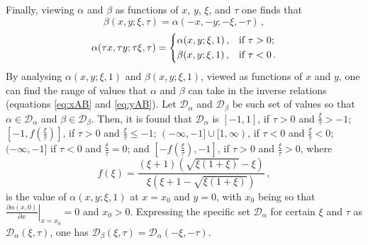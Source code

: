 \documentclass[12pt, ams, nofootinbib]{revtex4}
\def\be{\begin{equation}}
\def\ee{\end{equation}}
\newcommand{\rob}[1]{\left(#1\right)}    %
\newcommand{\sqb}[1]{\left[#1\right]}    %
\theoremstyle{definition}
\begin{document}
Finally, viewing $\alpha$ and $\beta$ as functions of $x$, $y$, $\xi$, and $\tau$ one finds that
\be 
	\beta(x,y;\xi,\tau)=\alpha(-x,-y;-\xi,-\tau)\,,
\ee
\be \alpha(\tau x,\tau y; \tau \xi,\tau) = \begin{dcases}
	\alpha(x,y;\xi,1)\,, &\text{if   }\tau>0; \\
	\beta(x,y;\xi,1)\,, &\text{if   }\tau<0\,.
\end{dcases}
\ee
By analysing $\alpha(x,y;\xi,1)$ and $\beta(x,y;\xi,1)$, viewed as functions of $x$ and $y$, one can find the range of values that $\alpha$ and $\beta$ can take in the inverse relations (equations \ref{eq:xAB} and \ref{eq:yAB}). Let $\mathcal{D}_\alpha$ and $\mathcal{D}_\beta$ be such set of values so that $\alpha\in\mathcal{D}_\alpha$ and $\beta\in\mathcal{D}_\beta$. Then, it is found that $\mathcal{D}_\alpha$ is $[-1,1]$, if $\tau>0$ and $\frac{\xi}{\tau}>-1$; $[-1,f{\rob{\frac{\xi}{\tau}}}]$, if $\tau>0$ and $\frac{\xi}{\tau}\leq -1$; $(-\infty,-1]\cup[1,\infty)$, if $\tau<0$ and $\frac{\xi}{\tau}<0$; $(-\infty,-1]$ if $\tau<0$ and $\frac{\xi}{\tau}=0$; and $[-f{\rob{\frac{\xi}{\tau}}},-1]$, if $\tau>0$ and $\frac{\xi}{\tau}>0$, where
\be
	f(\xi) = \frac{(\xi+1)\rob{\sqrt{\xi(1+\xi)}-\xi}}{\xi\rob{\xi+1-\sqrt{\xi(1+\xi)}}}\,,
\ee
is the value of $\alpha(x,y;\xi,1)$ at $x=x_0$ and $y=0$, with $x_0$ being so that $\left.\frac{\partial\alpha(x,0)}{\partial x}\right|_{x=x_0}=0$ and $x_0>0$. Expressing the specific set $\mathcal{D}_\alpha$ for certain $\xi$ and $\tau$ as $\mathcal{D}_{\alpha}(\xi,\tau)$, one has $\mathcal{D}_{\beta}(\xi,\tau) = \mathcal{D}_\alpha(-\xi,-\tau)$.
\end{document}
